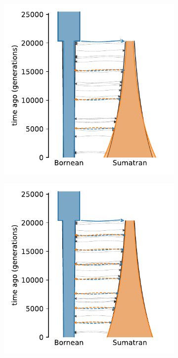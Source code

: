 \begin{figure}[ht]
\begin{subfigure}[b]{0.24\linewidth}
        \caption{}
        \label{fig:part2:experiments:sim2:results:oran_pulse_1}
    \end{subfigure}%
    \begin{subfigure}[b]{0.24\linewidth}
        \centering
        \includegraphics[width=\textwidth]{images_experiments/suimulation_2_stdpopsim/ORAN-PULSE/oran-pulse-3.pdf}
        \caption{}
        \label{fig:part2:experiments:sim2:results:oran_pulse_3}
    \end{subfigure}%
    \begin{subfigure}[b]{0.24\linewidth}
        \centering
        \includegraphics[width=\textwidth]{images_experiments/suimulation_2_stdpopsim/ORAN-PULSE/oran-pulse-7.pdf}

\end{subfigure}
\end{figure}

